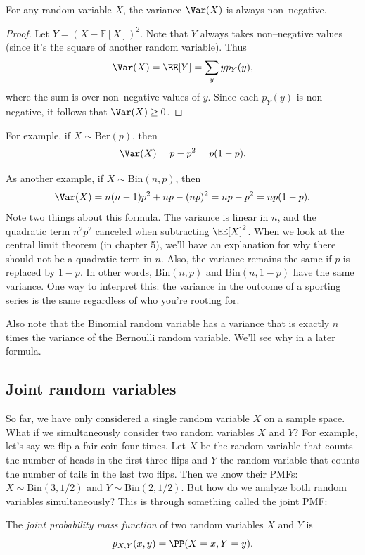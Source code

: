 \documentclass{ximera}
\begin{document}
\begin{proposition}
For any random variable $X$, the variance $\Var(X)$ is always non--negative.
\end{proposition}
\begin{proof}
Let $Y=(X- \mathbb{E}[X])^2$. Note that $Y$ always takes non--negative values (since it's the square of another random variable). Thus
$$
\Var(X) = \EE[Y] = \sum_{y} y p_Y(y),
$$ 
where the sum is over non--negative values of $y$. Since each $p_Y(y)$ is non--negative, it follows that $\Var(X) \geq 0$.
\end{proof}

For example, if $X \sim \text{Ber}(p)$, then
$$
\Var(X) = p - p^2 = p(1-p).
$$

As another example, if $X\sim \text{Bin}(n,p)$, then
$$
\Var(X) = n(n-1)p^2+np - (np)^2 = np-p^2 = np(1-p).
$$
Note two things about this formula. The variance is linear in $n$, and the quadratic term $n^2p^2$ canceled when subtracting $\EE[X]^2$. When we look at the central limit theorem (in chapter 5), we'll have an explanation for why there should not be a quadratic term in $n$. Also, the variance remains the same if $p$ is replaced by $1-p$. In other words, $\text{Bin}(n,p)$ and Bin$(n,1-p)$ have the same variance. One way to interpret this: the variance in the outcome of a sporting series is the same regardless of who you're rooting for.

Also note that the Binomial random variable has a variance that is exactly $n$ times the variance of the Bernoulli random variable. We'll see why in a later formula.




\subsection{Joint random variables}
So far, we have only considered a single random variable $X$ on a sample space. What if we simultaneously consider two random variables $X$ and $Y$? For example, let's say we flip a fair coin four times. Let $X$ be the random variable that counts the number of heads in the first three flips and $Y$ the random variable that counts the number of tails in the last two flips. Then we know their PMFs: $X \sim \text{Bin}(3,1/2)$ and $Y\sim \text{Bin}(2,1/2)$. But how do we analyze both random variables simultaneously? This is through something called the joint PMF:

\begin{definition}
The \textit{joint probability mass function} of two random variables $X$ and $Y$ is
$$
p_{X,Y}(x,y) = \PP(X=x,Y=y).
$$
\end{definition}
\end{document}
